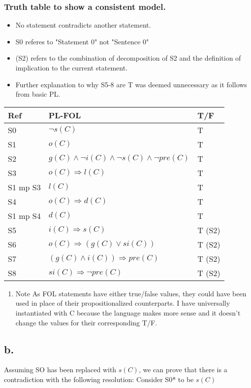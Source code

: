 \documentclass[11pt]{article}
\begin{document}
\subsubsection{Truth table to show a consistent model.}
\label{sec:org1e14709}
\begin{itemize}
\item No statement contradicts another statement.
\item S0 referes to "Statement 0" not "Sentence 0"
\item (S2) refers to the combination of decomposition of S2 and the definition of implication to the current statement.
\item Further explanation to why S5-8 are T was deemed unnecessary as it follows from basic PL.
\end{itemize}
\FloatBarrier
\begin{center}
\begin{tabular}{lll}
Ref & PL-FOL & T/F\\
\hline
S0 & \(\lnot s(C)\) & T\\
S1 & \(o(C)\) & T\\
S2 & \(g(C) \land \lnot i(C) \land \lnot s(C) \land \lnot pre(C)\) & T\\
S3 & \(o(C) \Rightarrow l(C)\) & T\\
S1 mp S3 & \(l(C)\) & T\\
S4 & \(o(C) \Rightarrow d(C)\) & T\\
S1 mp S4 & \(d(C)\) & T\\
S5 & \(i(C) \Rightarrow s(C)\) & T (S2)\\
S6 & \(o(C) \Rightarrow (g(C) \lor si(C))\) & T (S2)\\
S7 & \((g(C) \land i(C)) \Rightarrow pre(C)\) & T (S2)\\
S8 & \(si(C) \Rightarrow \lnot pre(C)\) & T (S2)\\
\end{tabular}
\end{center}
\FloatBarriers
\begin{enumerate}
\item Note
\label{sec:org84ccc97}
As FOL statements have either true/false values, they could have been used in place of their propositionalized counterparts. I have universally instantiated with C because the language makes more sense and it doesn't change the values for their corresponding T/F.
\end{enumerate}
\subsection{b.}
\label{sec:org5be83f3}
Assuming SO has been replaced with \(s(C)\), we can prove that there is a contradiction with the following resolution:
Consider S0* to be \(s(C)\)
\end{document}
